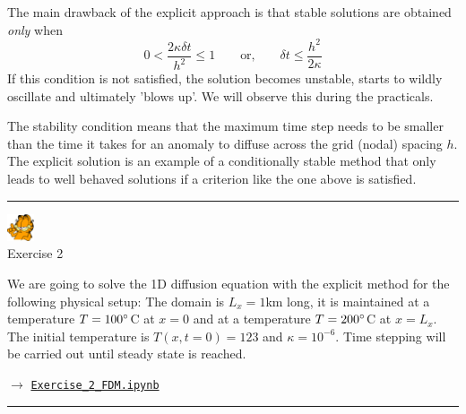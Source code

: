 \noindent The main drawback of the explicit approach is that stable solutions are
obtained {\it only} when
\begin{equation}
0 < \frac{2\kappa \delta t}{h^2} \leq1
\qquad
\text{or,}
\qquad
\delta t \leq \frac{h^2}{2 \kappa}
\end{equation}
If this condition is not satisfied, the solution becomes {\color{olive} unstable}, starts to
wildly oscillate and ultimately 'blows up'. We will observe this during the practicals. 

The stability condition means that the maximum time step needs to be smaller than the time it
takes for an anomaly to diffuse across the grid (nodal) spacing $h$.
The explicit solution is an example of a {\color{olive} conditionally stable method}
that only leads to well behaved solutions if a criterion like the one above is satisfied.

\begin{center}
\begin{minipage}[t]{0.77\textwidth}
\par\noindent\rule{\textwidth}{0.4pt}

\begin{center}
\includegraphics[width=0.8cm]{images/garftr} \\
{\color{orange}Exercise 2}
\end{center}

We are going to solve the 1D diffusion equation with the explicit method
for the following physical setup: The domain is $L_x=1$km long, 
it is maintained at a temperature $T=100\degree$C at $x=0$ and at a temperature
$T=200\degree$C at $x=L_x$. The initial temperature is $T(x,t=0)=123$
and $\kappa=10^{-6}$. 
Time stepping will be carried out until steady state is reached.

$\rightarrow$ 
\href{http://cedricthieulot.net/images/compgeo/Exercise_2_FDM.ipynb}
{\tt Exercise\_2\_FDM.ipynb}

\par\noindent\rule{\textwidth}{0.4pt}
\end{minipage}
\end{center}


